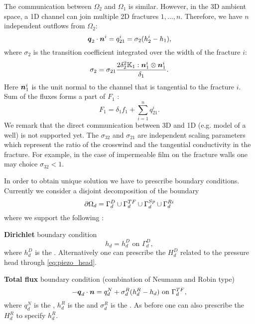 The communication between $\Omega_2$  and  $\Omega_1$ is similar.  However, in the 3D ambient space,
a 1D channel can join multiple 2D fractures $1,\dots, n$. Therefore, we have $n$
independent outflows from $\Omega_2$:
\begin{equation*}
        \mathbf{\boldsymbol{q}}_2\cdot \mathbf{\boldsymbol{n}}^{i} = q_{21}^{i} =\sigma_{2} (h_2^{i}-h_1),
\end{equation*}
where $\sigma_2$  is the transition coefficient integrated over the width of the fracture $i$:
\[
\label{e:sigma2_law}
  \sigma_2 = \sigma_{21} \frac{2\delta_2^2\tn K_1:{\vc n_1^i}\otimes{\vc n_1^i}}{\delta_1}.
\]
Here $\mathbf{\boldsymbol{n}}_1^i$ is the unit normal to the channel that is tangential to the fracture $i$.
Sum of the fluxes forms a part of $F_1$ :
\begin{equation}
   \label{source_1D}
   F_1 = \delta_1 f_1 + \sum_{i=1}^n q_{21}^{i}. 
\end{equation}
We remark that the direct communication between 3D and 1D (e.g. model of a well) is not supported yet.
The  
{$\sigma_{32}$} \units{}{}{} and
{$\sigma_{21}$} \units{}{}{} are independent scaling parameters which represent 
the ratio of the crosswind and the tangential conductivity in the fracture. For example, in the case of impermeable film
on the fracture walls one may choice $\sigma_{32} < 1$.


In order to obtain unique solution we have to prescribe boundary conditions.
Currently we consider a disjoint decomposition of the boundary
\[
    \partial\Omega_d = \Gamma_d^D \cup \Gamma_d^{TF} \cup \Gamma_d^{Sp} \cup \Gamma_d^{Ri}
\]
where we support the following
:

{\bf Dirichlet} boundary condition
\[
    h_d = h_d^D        \text{ on }\Gamma_d^D,
\]
where $h_d^D$  is the  .
Alternatively one can prescribe the 
$H_d^D$  related to the pressure head through \eqref{eq:piezo_head}.

{\bf Total flux} boundary condition (combination of Neumann and Robin type)
\[
    -\mathbf{\boldsymbol{q}}_d \cdot \mathbf{\boldsymbol{n}} = q_d^N + \sigma_d^R ( h_d^R - h_d)        \text{ on }\Gamma_d^{TF},
\]
where $q_d^N$  is the ,
$h_d^R$ is the  and
$\sigma_d^R$   
is the .
As before one can also prescribe the 
$H_d^R$ to specify $h_d^R$.

